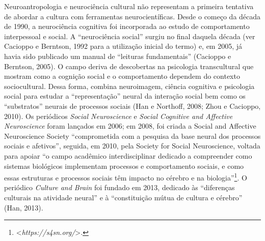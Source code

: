 Neuroantropologia e neurociência cultural não representam a primeira
tentativa de abordar a cultura com ferramentas neurocientíficas. Desde o
começo da década de 1990, a neurociência cognitiva foi incorporada ao
estudo de comportamento interpessoal e social. A ``neurociência social''
surgiu no final daquela década (ver Cacioppo e Berntson, 1992 para a
utilização inicial do termo) e, em 2005, já havia sido publicado um
manual de ``leituras fundamentais'' (Cacioppo e Berntson, 2005). O campo
deriva de descobertas na psicologia transcultural que mostram como a
cognição social e o comportamento dependem do contexto sociocultural.
Dessa forma, combina neuroimagem, ciência cognitiva e psicologia social
para estudar a ``representação'' neural da interação social bem como os
``substratos'' neurais de processos sociais (Han e Northoff, 2008; Zhou
e Cacioppo, 2010). Os periódicos \emph{Social Neuroscience} e
\emph{Social Cognitive and Affective Neuroscience} foram lançados em
2006; em 2008, foi criada a Social and Affective Neuroscience Society
``comprometida com a pesquisa da base neural dos processos sociais e
afetivos'', seguida, em 2010, pela Society for Social Neuroscience,
voltada para apoiar ``o campo acadêmico interdisciplinar dedicado a
compreender como sistemas biológicos implementam processos e
comportamento sociais, e como essas estruturas e processos sociais têm
impacto no cérebro e na biologia''\footnote[11]{\textless{}\emph{https://s4sn.org/}\textgreater{}.}. O periódico
\emph{Culture and Brain} foi fundado em 2013, dedicado às ``diferenças
culturais na atividade neural'' e à ``constituição mútua de cultura e
cérebro'' (Han, 2013).

